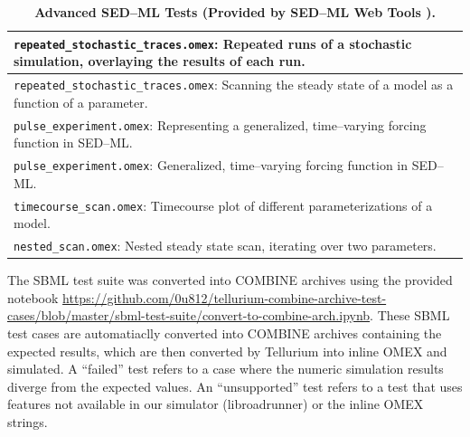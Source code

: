 \documentclass[10pt,letterpaper]{article}
\newlength\savedwidth
\newcommand\thickhline{\noalign{\global\savedwidth\arrayrulewidth\global\arrayrulewidth 2pt}%
\hline
\noalign{\global\arrayrulewidth\savedwidth}}
\begin{document}
\begin{table}[!ht]
\centering
\caption{
{\bf Advanced SED--ML Tests (Provided by SED--ML Web Tools \cite{bergmann2017sed}).} }
\begin{tabular}{p{12cm}}
\hline %
  \texttt{repeated\_stochastic\_traces.omex}: Repeated runs of a stochastic simulation, overlaying the results of each run. \\ \hline
  \texttt{repeated\_stochastic\_traces.omex}: Scanning the steady state of a model as a function of a parameter. \\ \hline
  \texttt{pulse\_experiment.omex}: Representing a generalized, time--varying forcing function in SED--ML. \\ \hline
  \texttt{pulse\_experiment.omex}: Generalized, time--varying forcing function in SED--ML. \\ \hline
  \texttt{timecourse\_scan.omex}: Timecourse plot of different parameterizations of a model. \\ \hline
  \texttt{nested\_scan.omex}: Nested steady state scan, iterating over two parameters. \\ \hline
\end{tabular}
\begin{flushleft} The SBML test suite was converted into COMBINE archives using the provided notebook \href{https://github.com/0u812/tellurium-combine-archive-test-cases/blob/master/sbml-test-suite/convert-to-combine-arch.ipynb}{https://github.com/0u812/tellurium-combine-archive-test-cases/blob/master/sbml-test-suite/convert-to-combine-arch.ipynb}. These SBML test cases are automatiaclly converted into COMBINE archives containing the expected results, which are then converted by Tellurium into inline OMEX and simulated. A ``failed'' test refers to a case where the numeric simulation results diverge from the expected values. An ``unsupported'' test refers to a test that uses features not available in our simulator (libroadrunner) or the inline OMEX strings.
\end{flushleft}
\label{swt-examples}
\end{table}
\end{document}
